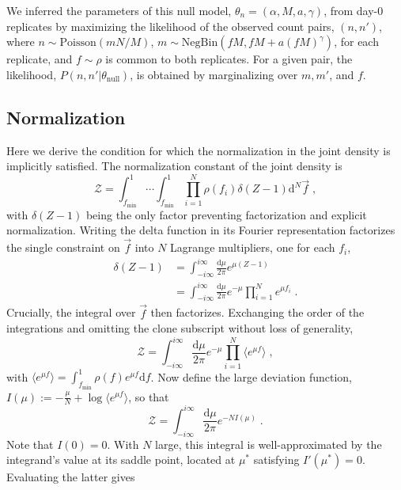 \documentclass[letterpaper,english,prl,reprint,longbibliography]{revtex4-1} %
\begin{document}
We inferred the parameters of this null model, $\theta_n=(\alpha,M,a,\gamma)$, from day-0 replicates by maximizing the likelihood of the observed count pairs, $(n,n')$, where $n\sim \mathrm{Poisson}(m N/M)$, $m\sim \mathrm{NegBin}(fM,fM+a (fM)^{\gamma})$, for each replicate, and $f\sim\rho$ is common to both replicates. For a given pair, the likelihood, $P(n,n'|\theta_{\textrm{null}})$, is obtained by marginalizing over $m,m'$, and $f$.

\subsection*{Normalization}
Here we derive the condition for which the normalization in the joint density is implicitly satisfied. The normalization constant of the joint density is
\begin{equation}
	\mathcal{Z}=\int_{f_\textrm{min}}^1\cdots\int_{f_\textrm{min}}^1\prod_{i=1}^N \rho(f_i)\delta(Z-1)\textrm{d}^N\vec{f} \;,
\end{equation}
with $\delta(Z-1)$ being the only factor preventing factorization and explicit normalization. Writing the delta function in its Fourier representation factorizes the single constraint on $\vec{f}$ into $N$ Lagrange multipliers, one for each $f_i$,
\begin{align}
	\delta(Z-1)&=\int_{-i\infty}^{i\infty} \frac{\textrm{d} \mu}{2 \pi}e^{\mu(Z-1)}  \\
	&=\int_{-i\infty}^{i\infty} \frac{\textrm{d} \mu}{2 \pi}e^{-\mu}\prod_{i=1}^N e^{\mu f_i} \;.
\end{align}
Crucially, the integral over $\vec{f}$ then factorizes. Exchanging the order of the integrations and omitting the clone subscript without loss of generality,
\begin{equation}
	\mathcal{Z}=\int_{-i\infty}^{i\infty} \frac{\textrm{d} \mu}{2 \pi} e^{-\mu} \prod_{i=1}^N \langle e^{\mu f}\rangle\;,\label{eq:bigZ}
\end{equation}
with $\langle e^{\mu f}\rangle=\int_{f_\textrm{min}}^1\rho(f)e^{\mu f}\textrm{d}f$. Now define the large deviation function, $I(\mu):=-\frac{\mu}{N}+\log \langle e^{\mu f}\rangle$, so that 
\begin{equation}
	\mathcal{Z}=\int_{-i\infty}^{i\infty} \frac{\textrm{d} \mu}{2 \pi} e^{-N I(\mu)}\;.\label{eq:largedev}
\end{equation}
Note that $I(0)=0$. With $N$ large, this integral is well-approximated by the integrand's value at its saddle point, located at $\mu^*$ satisfying $I'(\mu^*)=0$.  Evaluating the latter gives
\end{document}
